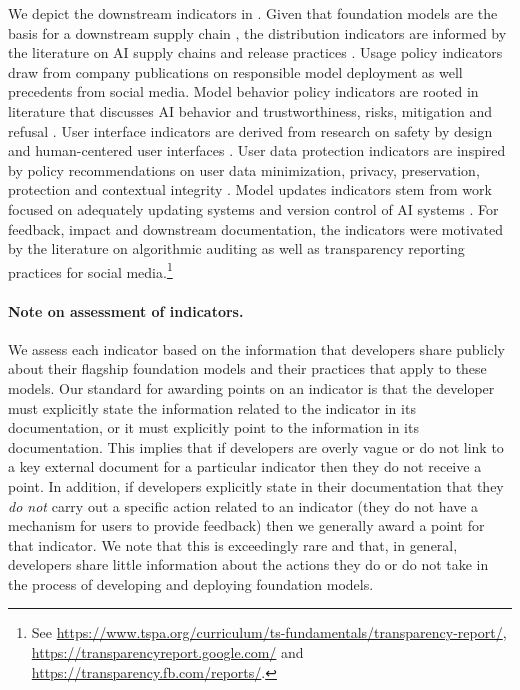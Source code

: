 \noindent We depict the downstream indicators in .
Given that foundation models are the basis for a downstream supply chain \citep{bommasani2021opportunities}, the distribution indicators are informed by the literature on AI supply chains \citep{bommasani2023ecosystem, vipra2023concentration, cen2023supplychain, cobbe2023supply, widder2023thinking, brown2023allocating} and release practices \citep{liang2022thetime, solaiman2023gradient, henderson2023foundation, pmlr-v202-kirchenbauer23a, Kuditipudi2023RobustDW, liesenfeld2023opening}. 
Usage policy indicators draw from company publications on responsible model deployment \cite{cohere2022} as well precedents from social media. 
Model behavior policy indicators are rooted in literature that discusses AI behavior and trustworthiness, risks, mitigation and refusal \cite{kumar2022language, weidinger2021ethical, brundage2020toward, cammarota2020trustworthy, kumar2020trustworthy, liu2022trustworthy, reuter2023im}. 
User interface indicators are derived from research on safety by design and human-centered user interfaces \cite{qiaosi2023ux, nakao2022responsible}. 
User data protection indicators are inspired by policy recommendations on user data minimization, privacy, preservation, protection and contextual integrity \cite{eu2016, brown2022does,vipra2023, winograd2023privacy, nissenbaum2004contextual, king2020privacy, mulligan2017privacy}.
Model updates indicators stem from work focused on adequately updating systems and version control of AI systems \citep{sathyavageesran2022privacy, hashesh2023version, chen2023chatgpts}. 
For feedback, impact and downstream documentation, the indicators were motivated by the literature on algorithmic auditing \cite{liang2022thetime, solaiman2023gradient, raji2022audit} as well as transparency reporting practices for social media.\footnote{See \url{https://www.tspa.org/curriculum/ts-fundamentals/transparency-report/}, \url{https://transparencyreport.google.com/} and \url{https://transparency.fb.com/reports/}.}

\paragraph{Note on assessment of indicators.}
We assess each indicator based on the information that developers share publicly about their flagship foundation models and their practices that apply to these models. 
Our standard for awarding points on an indicator is that the developer must explicitly state the information related to the indicator in its documentation, or it must explicitly point to the information in its documentation.
This implies that if developers are overly vague or do not link to a key external document for a particular indicator then they do not receive a point.
In addition, if developers explicitly state in their documentation that they \emph{do not} carry out a specific action related to an indicator (\eg they do not have a mechanism for users to provide feedback) then we generally award a point for that indicator.
We note that this is exceedingly rare and that, in general, developers share little information about the actions they do or do not take in the process of developing and deploying foundation models.

